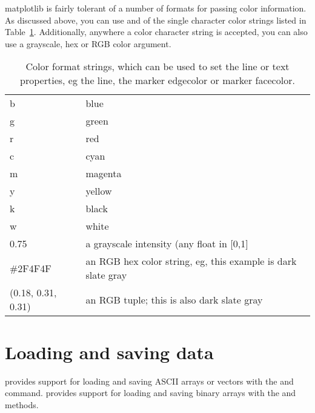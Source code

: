 \documentclass[]{book}
\begin{document}
matplotlib is fairly tolerant of a number of formats for passing color
information.  As discussed above, you can use and of the single
character color strings listed in Table~\ref{tab:color_strings}.
Additionally, anywhere a color character string is accepted, you can
also use a grayscale, hex or RGB color argument.



\begin{table}[htbp]
  \centering
  \begin{tabular}[t]{|l|l|}\hline
      b  & blue\\
      g  & green\\
      r  & red\\
      c  & cyan\\
      m  & magenta\\
      y  & yellow\\
      k  & black\\
      w  & white\\
      0.75  & a grayscale intensity (any float in [0,1]\\
      \#2F4F4F & an RGB hex color string, eg, this example is dark slate
      gray\\
      (0.18, 0.31, 0.31)  & an RGB tuple; this is also dark slate gray\\\hline
  \end{tabular}
  \caption{\label{tab:color_strings}Color format strings, which can be
      used to set the line or text properties, eg the line, the marker
      edgecolor or marker facecolor.  }
\end{table}

\section{Loading and saving data}
\label{sec:loading_data}

 provides support for loading and saving
ASCII arrays or vectors with the  and  command.
 provides support for loading and saving
binary arrays with the  and  methods.
\end{document}
